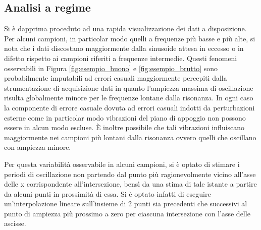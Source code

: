 \documentclass[a4paper,11pt,oneside]{article}
\begin{document}
\subsection{Analisi a regime}
Si è dapprima proceduto ad una rapida visualizzazione dei dati a disposizione.
Per alcuni campioni, in particolar modo quelli a frequenze più basse e più alte, si nota che i dati discostano maggiormente dalla sinusoide attesa in eccesso o in difetto rispetto ai campioni riferiti a frequenze intermedie.
Questi fenomeni osservabili in Figura \ref{fig:esempio_buono} e \ref{fig:esempio_brutto} sono probabilmente imputabili ad errori casuali maggiormente percepiti dalla strumentazione di acquisizione dati in quanto l'ampiezza massima di oscillazione risulta globalmente minore per le frequenze lontane dalla risonanza.
In ogni caso la componente di errore casuale dovuta ad errori casuali indotti da perturbazioni esterne come in particolar modo vibrazioni del piano di appoggio non possono essere in alcun modo escluse. È inoltre possibile che tali vibrazioni influiscano maggiormente nei campioni più lontani dalla risonanza ovvero quelli che oscillano con ampiezza minore.



\begin{figure}[h!]
    \centering
    
    \caption*{}
\end{figure}



Per questa variabilità osservabile in alcuni campioni, si è optato di stimare i periodi di oscillazione non partendo dal punto più ragionevolmente vicino all'asse delle x corrispondente all'intersezione, bensì da una stima di tale istante a partire da alcuni punti in prossimità di essa. Si è optato infatti di eseguire un'interpolazione lineare sull'insieme di 2 punti sia precedenti che successivi al punto di ampiezza più prossimo a zero per ciascuna intersezione con l'asse delle ascisse.

\end{document}
